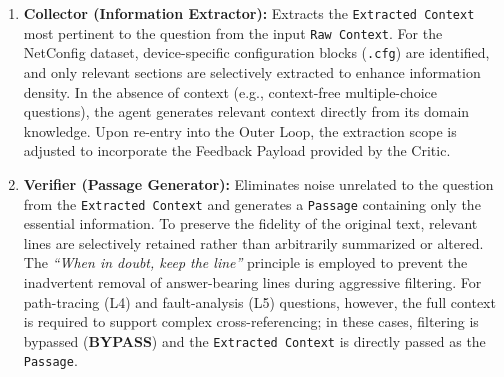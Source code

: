 \begin{enumerate}

\item \textbf{Collector (Information Extractor):}
  Extracts the \texttt{Extracted Context} most pertinent to the question from the input \texttt{Raw Context}.
  For the NetConfig dataset, device-specific configuration blocks (\texttt{.cfg}) are identified, and only relevant sections are selectively extracted to enhance information density.
  In the absence of context (e.g., context-free multiple-choice questions), the agent generates relevant context directly from its domain knowledge.
  Upon re-entry into the Outer Loop, the extraction scope is adjusted to incorporate the Feedback Payload provided by the Critic.

\item \textbf{Verifier (Passage Generator):}
  Eliminates noise unrelated to the question from the \texttt{Extracted Context} and generates a \texttt{Passage} containing only the essential information.
  To preserve the fidelity of the original text, relevant lines are selectively retained rather than arbitrarily summarized or altered.
  The \textit{``When in doubt, keep the line''} principle is employed to prevent the inadvertent removal of answer-bearing lines during aggressive filtering.
  For path-tracing (L4) and fault-analysis (L5) questions, however, the full context is required to support complex cross-referencing; in these cases, filtering is bypassed (\textbf{BYPASS}) and the \texttt{Extracted Context} is directly passed as the \texttt{Passage}.





\end{enumerate}
